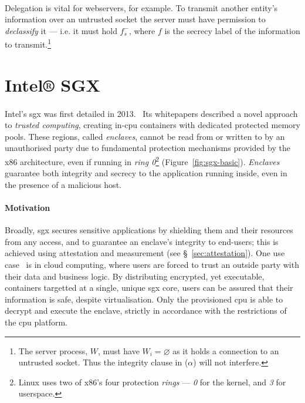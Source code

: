 \paragraph{} Delegation is vital for webservers, for example. To transmit another entity's information over an untrusted socket the server must have permission to \textit{declassify} it --- i.e. it must hold $f_{s}^{-}$, where $f$ is the secrecy label of the information to transmit.\footnote{The server process, $W$, must have $W_{i} = \varnothing$ as it holds a connection to an untrusted socket. Thus the integrity clause in ($\alpha$) will not interfere.}


\clearpage
\section{Intel® SGX}

\paragraph{} Intel's \acrfull{sgx} was first detailed in 2013.~\cite{10.1145/2487726.2488370, 10.1145/2487726.2488368, Anati2013InnovativeTF, sgx-sgx-reference} Its whitepapers described a novel approach to \textit{trusted computing}, creating in-\acrshort{cpu} containers with dedicated protected memory pools. These regions, called \textit{enclaves}, cannot be read from or written to by an unauthorised party due to fundamental protection mechanisms provided by the x86 architecture, even if running in \textit{ring 0}\footnote{Linux uses two of x86's four protection \textit{rings} --- \textit{0} for the kernel, and \textit{3} for userspace.} (Figure~\ref{fig:sgx-basic}). \textit{Enclaves} guarantee both integrity and secrecy to the application running inside, even in the presence of a malicious host.

\paragraph{Motivation} Broadly, \acrshort{sgx} secures sensitive applications by shielding them and their resources from any access, and to guarantee an enclave's integrity to end-users; this is achieved using attestation and measurement (see §~\ref{sec:attestation}). One use case~\cite{10.1145/2834050.2834100, 10.1145/2799647, 10.1145/2810103.2813695} is in cloud computing, where users are forced to trust an outside party with their data and business logic. By distributing encrypted, yet executable, containers targetted at a single, unique \acrshort{sgx} core, users can be assured that their information is safe, despite virtualisation. Only the provisioned \acrshort{cpu} is able to decrypt and execute the enclave, strictly in accordance with the restrictions of the \acrshort{cpu} platform.

